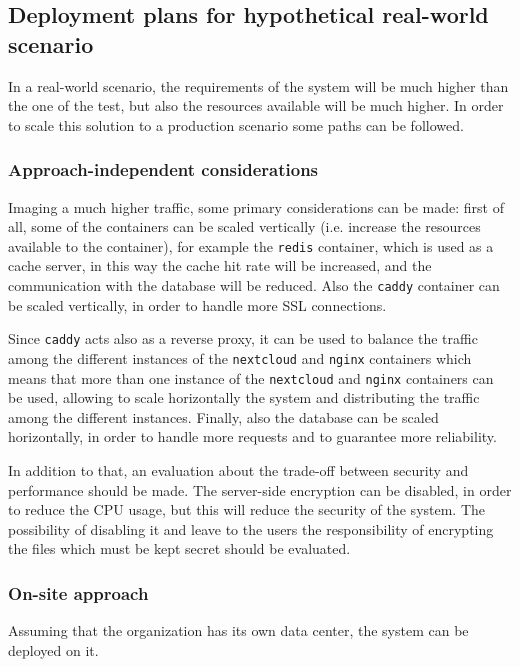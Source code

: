 \subsection{Deployment plans for hypothetical real-world scenario}
\label{subsec:deployment-real-world}

In a real-world scenario, the requirements of the system will be much higher than the one of the test, but also the resources available will be much higher.
In order to scale this solution to a production scenario some paths can be followed. 

\subsubsection{Approach-independent considerations}
\label{subsubsec:approach-independent}

Imaging a much higher traffic, some primary considerations can be made: 
first of all, some of the containers can be scaled vertically (i.e. increase the resources available to the container), for example the \texttt{redis} container, which is used as a cache server, in this way the cache hit rate will be increased, and the communication with the database will be reduced.
Also the \texttt{caddy} container can be scaled vertically, in order to handle more SSL connections.

Since \texttt{caddy} acts also as a reverse proxy, it can be used to balance the traffic among the different instances of the \texttt{nextcloud} and \texttt{nginx} containers which means that more than one instance of the \texttt{nextcloud} and \texttt{nginx} containers can be used, allowing to scale horizontally the system and distributing the traffic among the different instances.
Finally, also the database can be scaled horizontally, in order to handle more requests and to guarantee more reliability.

In addition to that, an evaluation about the trade-off between security and performance should be made. The server-side encryption can be disabled, in order to reduce the CPU usage, but this will reduce the security of the system. The possibility of disabling it and leave to the users the responsibility of encrypting the files which must be kept secret should be evaluated.

\subsubsection{On-site approach}
\label{subsubsec:cloudless}
Assuming that the organization has its own data center, the system can be deployed on it. 

